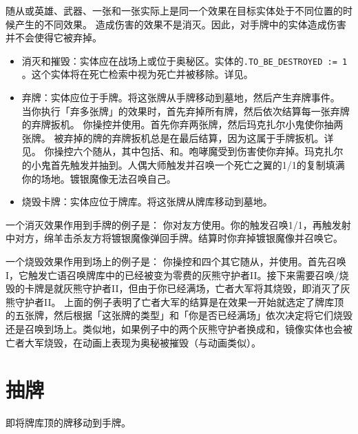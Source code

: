 随从或英雄、武器、一张和一张实际上是同一个效果在目标实体处于不同位置的时候产生的不同效果。
\notice 造成伤害的效果不是消灭。因此，对手牌中的实体造成伤害并不会使得它被弃掉。

\begin{itemize}
    \item 消灭和摧毁：实体应在战场上或位于奥秘区。实体的\texttt{.TO\_BE\_DESTROYED := 1} 。这个实体将在死亡检索中视为死亡并被移除。详见。
    \item 弃牌：实体应位于手牌。将这张牌从手牌移动到墓地，然后产生弃牌事件。
        \notice 当你执行「弃多张牌」的效果时，首先弃掉所有牌，然后依次结算每一张弃牌的弃牌扳机。
        \example 你操控并使用。首先你弃两张牌，然后玛克扎尔小鬼使你抽两张牌。
        \notice 被弃掉的牌的弃牌扳机总是在最后结算，因为这属于手牌扳机。详见。
        \example 你操控六个随从，其中包括、和。咆哮魔受到伤害使你弃掉。玛克扎尔的小鬼首先触发并抽到。人偶大师触发并召唤一个死亡之翼的1/1的复制填满你的场地。镀银魔像无法召唤自己。
    \item 烧毁卡牌：实体应位于牌库。将这张牌从牌库移动到墓地。
\end{itemize}

一个消灭效果作用到手牌的例子是：
\example 你对友方使用。你的触发召唤1/1，再触发射中对方，绵羊击杀友方将镀银魔像弹回手牌。结算时你弃掉镀银魔像并召唤它。

一个烧毁效果作用到场上的例子是：
\example 你操控和四个其它随从，并使用。首先召唤I，它触发亡语召唤牌库中的已经被变为零费的灰熊守护者II。接下来需要召唤/烧毁的卡牌是就灰熊守护者II，但由于你已经满场，亡者大军将其烧毁，即消灭了灰熊守护者II。
\notice 上面的例子表明了亡者大军的结算是在效果一开始就选定了牌库顶的五张牌，然后根据「这张牌的类型」和「你是否已经满场」依次决定将它们烧毁还是召唤到场上。类似地，如果例子中的两个灰熊守护者换成和，镜像实体也会被亡者大军烧毁，在动画上表现为奥秘被摧毁（与动画类似）。

\section{抽牌}
即将牌库顶的牌移动到手牌。


